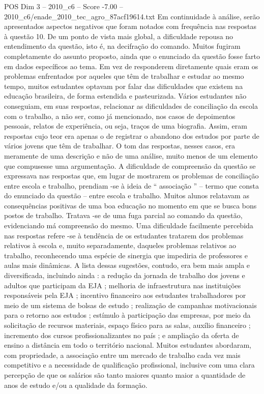 \begin{textsample}{POS Dim 3 – 2010\_c6 – Score -7.00 – 2010\_c6/enade\_2010\_tec\_agro\_87acf19614.txt}
Em continuidade à análise, serão apresentados aspectos negativos que foram notados com frequência nas respostas à questão 10.
De um ponto de vista mais global, a dificuldade repousa no entendimento da questão, isto é, na decifração do comando.
Muitos fugiram completamente do assunto proposto, ainda que o enunciado da questão fosse farto em dados específicos ao tema.
Em vez de responderem diretamente quais eram os problemas enfrentados por aqueles que têm de trabalhar e estudar ao mesmo tempo, muitos estudantes optavam por falar das dificuldades que existem na educação brasileira, de forma estendida e pasteurizada.
Vários estudantes não conseguiam, em suas respostas, relacionar as dificuldades de conciliação da escola com o trabalho, a não ser, como já mencionado, nos casos de depoimentos pessoais, relatos de experiência, ou seja, traços de uma biografia.
Assim, eram respostas cujo teor era apenas o de registrar o abandono dos estudos por parte de vários jovens que têm de trabalhar.
O tom das respostas, nesses casos, era meramente de uma descrição e não de uma análise, muito menos de um elemento que compusesse uma argumentação.
A dificuldade de compreensão da questão se expressava nas respostas que, em lugar de mostrarem os problemas de conciliação entre escola e trabalho, prendiam -se à ideia de “ associação ” – termo que consta do enunciado da questão – entre escola e trabalho.
Muitos alunos relatavam as consequências positivas de uma boa educação no momento em que se busca bons postos de trabalho.
Tratava -se de uma fuga parcial ao comando da questão, evidenciando má compreensão do mesmo.
Uma dificuldade facilmente percebida nas respostas refere -se à tendência de os estudantes tratarem dos problemas relativos à escola e, muito separadamente, daqueles problemas relativos ao trabalho, reconhecendo uma espécie de sinergia que impediria de professores e aulas mais dinâmicas.
A lista dessas sugestões, contudo, era bem mais ampla e diversificada, incluindo ainda : a redução da jornada de trabalho dos jovens e adultos que participam da EJA ; melhoria de infraestrutura nas instituições responsáveis pela EJA ; incentivo financeiro aos estudantes trabalhadores por meio de um sistema de bolsas de estudo ; realização de campanhas motivacionais para o retorno aos estudos ; estímulo à participação das empresas, por meio da solicitação de recursos materiais, espaço físico para as salas, auxílio financeiro ; incremento dos cursos profissionalizantes no país ; e ampliação da oferta de ensino a distância em todo o território nacional.
Muitos estudantes abordaram, com propriedade, a associação entre um mercado de trabalho cada vez mais competitivo e a necessidade de qualificação profissional, inclusive com uma clara percepção de que os salários são tanto maiores quanto maior a quantidade de anos de estudo e/ou a qualidade da formação.

\end{textsample}

